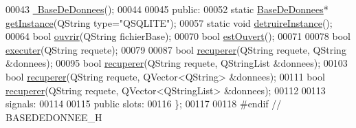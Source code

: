 \begin{DoxyCode}
00043     \hyperlink{class_base_de_donnees_a5dc474cdbe003644fb0ca7b8f2ec6b93}{~BaseDeDonnees}();
00044 
00045 \textcolor{keyword}{public}:
00052     \textcolor{keyword}{static} \hyperlink{class_base_de_donnees}{BaseDeDonnees}* \hyperlink{class_base_de_donnees_a58beb2f702f75b257e2e55e25d9f979b}{getInstance}(QString type=\textcolor{stringliteral}{"QSQLITE"});
00057     \textcolor{keyword}{static} \textcolor{keywordtype}{void} \hyperlink{class_base_de_donnees_a457401c0816b888c77ce915997545f4e}{detruireInstance}();
00064     \textcolor{keywordtype}{bool} \hyperlink{class_base_de_donnees_a7f6a5510b08017b0d99115a84252f186}{ouvrir}(QString fichierBase);
00070     \textcolor{keywordtype}{bool} \hyperlink{class_base_de_donnees_af9ac332082ffd0dd35e412cefabe5e9c}{estOuvert}();
00071 
00078     \textcolor{keywordtype}{bool} \hyperlink{class_base_de_donnees_aa8de5f8f8bb17edc43f5c0ee33712081}{executer}(QString requete);
00079 
00087     \textcolor{keywordtype}{bool} \hyperlink{class_base_de_donnees_a77539baad389f5acf754cd2cd452403e}{recuperer}(QString requete, QString &donnees);
00095     \textcolor{keywordtype}{bool} \hyperlink{class_base_de_donnees_a77539baad389f5acf754cd2cd452403e}{recuperer}(QString requete, QStringList &donnees);
00103     \textcolor{keywordtype}{bool} \hyperlink{class_base_de_donnees_a77539baad389f5acf754cd2cd452403e}{recuperer}(QString requete, QVector<QString> &donnees);
00111     \textcolor{keywordtype}{bool} \hyperlink{class_base_de_donnees_a77539baad389f5acf754cd2cd452403e}{recuperer}(QString requete, QVector<QStringList> &donnees);
00112 
00113 signals:
00114 
00115 \textcolor{keyword}{public} slots:
00116 \};
00117 
00118 \textcolor{preprocessor}{#endif // BASEDEDONNEE\_H}
\end{DoxyCode}
